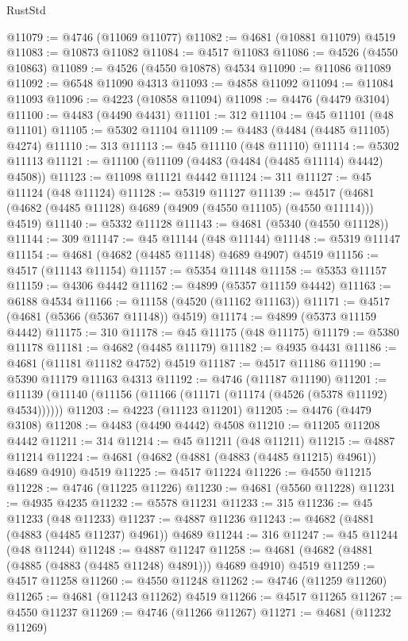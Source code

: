 \begin{lexlean}{RustStd}
\begin{coremodule}
@11079 := @4746 (@11069 @11077)
@11082 := @4681 (@10881 @11079) @4519
@11083 := @10873 @11082
@11084 := @4517 @11083
@11086 := @4526 (@4550 @10863)
@11089 := @4526 (@4550 @10878) @4534
@11090 := @11086 @11089
@11092 := @6548 @11090 @4313
@11093 := @4858 @11092
@11094 := @11084 @11093
@11096 := @4223 (@10858 @11094)
@11098 := @4476 (@4479 @3104)
@11100 := @4483 (@4490 @4431)
@11101 := 312
@11104 := @45 @11101 (@48 @11101)
@11105 := @5302 @11104
@11109 := @4483 (@4484 (@4485 @11105) @4274)
@11110 := 313
@11113 := @45 @11110 (@48 @11110)
@11114 := @5302 @11113
@11121 := @11100 (@11109 (@4483 (@4484 (@4485 @11114) @4442) @4508))
@11123 := @11098 @11121 @4442
@11124 := 311
@11127 := @45 @11124 (@48 @11124)
@11128 := @5319 @11127
@11139 := @4517 (@4681 (@4682 (@4485 @11128) @4689 (@4909 (@4550 @11105) (@4550 @11114))) @4519)
@11140 := @5332 @11128
@11143 := @4681 (@5340 (@4550 @11128))
@11144 := 309
@11147 := @45 @11144 (@48 @11144)
@11148 := @5319 @11147
@11154 := @4681 (@4682 (@4485 @11148) @4689 @4907) @4519
@11156 := @4517 (@11143 @11154)
@11157 := @5354 @11148
@11158 := @5353 @11157
@11159 := @4306 @4442
@11162 := @4899 (@5357 @11159 @4442)
@11163 := @6188 @4534
@11166 := @11158 (@4520 (@11162 @11163))
@11171 := @4517 (@4681 (@5366 (@5367 @11148)) @4519)
@11174 := @4899 (@5373 @11159 @4442)
@11175 := 310
@11178 := @45 @11175 (@48 @11175)
@11179 := @5380 @11178
@11181 := @4682 (@4485 @11179)
@11182 := @4935 @4431
@11186 := @4681 (@11181 @11182 @4752) @4519
@11187 := @4517 @11186
@11190 := @5390 @11179 @11163 @4313
@11192 := @4746 (@11187 @11190)
@11201 := @11139 (@11140 (@11156 (@11166 (@11171 (@11174 (@4526 (@5378 @11192) @4534))))))
@11203 := @4223 (@11123 @11201)
@11205 := @4476 (@4479 @3108)
@11208 := @4483 (@4490 @4442) @4508
@11210 := @11205 @11208 @4442
@11211 := 314
@11214 := @45 @11211 (@48 @11211)
@11215 := @4887 @11214
@11224 := @4681 (@4682 (@4881 (@4883 (@4485 @11215) @4961)) @4689 @4910) @4519
@11225 := @4517 @11224
@11226 := @4550 @11215
@11228 := @4746 (@11225 @11226)
@11230 := @4681 (@5560 @11228)
@11231 := @4935 @4235
@11232 := @5578 @11231
@11233 := 315
@11236 := @45 @11233 (@48 @11233)
@11237 := @4887 @11236
@11243 := @4682 (@4881 (@4883 (@4485 @11237) @4961)) @4689
@11244 := 316
@11247 := @45 @11244 (@48 @11244)
@11248 := @4887 @11247
@11258 := @4681 (@4682 (@4881 (@4885 (@4883 (@4485 @11248) @4891))) @4689 @4910) @4519
@11259 := @4517 @11258
@11260 := @4550 @11248
@11262 := @4746 (@11259 @11260)
@11265 := @4681 (@11243 @11262) @4519
@11266 := @4517 @11265
@11267 := @4550 @11237
@11269 := @4746 (@11266 @11267)
@11271 := @4681 (@11232 @11269)

\end{coremodule}
\end{lexlean}
